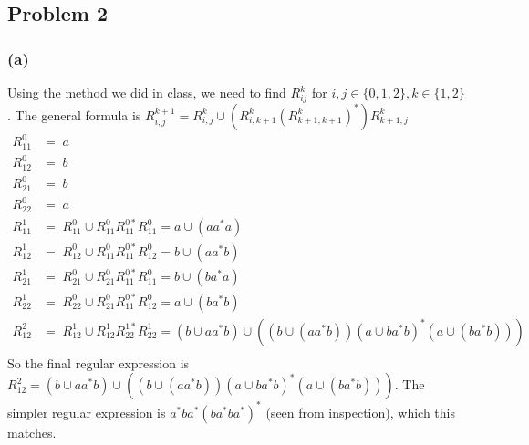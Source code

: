 \documentclass[english]{article}
\begin{document}

\subsection*{Problem 2}
\subsubsection*{(a)}
Using the method we did in class, we need to find $R_{ij}^k$ for $i,j \in \{0,1,2\}, k \in \{1,2\}$. The general formula is
$ R_{i,j}^{k+1} = R_{i,j}^{k} \cup (R_{i,k+1}^{k} (R_{k+1,k+1}^{k})^{*}) R_{k+1,j}^{k} $
\begin{align*}
R_{11}^{0} &=\; a \\
R_{12}^{0} &=\; b \\
R_{21}^{0} &=\; b \\
R_{22}^{0} &=\; a \\
R_{11}^{1} &=\; R_{11}^0 \cup R_{11}^0 R_{11}^{0*} R_{11}^0 = a \cup (a a^{*} a) \\
R_{12}^{1} &=\; R_{12}^0 \cup R_{11}^0 R_{11}^{0*} R_{12}^0 = b \cup (a a^{*} b) \\
R_{21}^{1} &=\; R_{21}^0 \cup R_{21}^0 R_{11}^{0*} R_{11}^0 = b \cup (b a^{*} a) \\
R_{22}^{1} &=\; R_{22}^0 \cup R_{21}^0 R_{11}^{0*} R_{12}^0 = a \cup (b a^{*} b) \\
R_{12}^{2} &=\; R_{12}^1 \cup R_{12}^1 R_{22}^{1*} R_{22}^1 = (b \cup a a^{*} b) \cup ((b \cup (a a^{*} b)) (a \cup b a^{*} b)^{*} (a \cup (b a^{*} b))) \\
\end{align*}
So the final regular expression is $R_{12}^{2} = (b \cup a a^{*} b) \cup ((b \cup (a a^{*} b)) (a \cup b a^{*} b)^{*} (a \cup (b a^{*} b)))$. The simpler regular expression is $a^{*} b a^{*} (b a^{*} b a^{*})^{*}$ (seen from inspection), which this matches.
\end{document}
